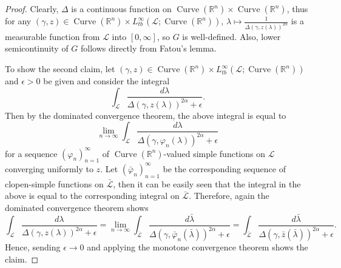 \documentclass[reqno,centertags,12pt]{amsart}
\theoremstyle{definition}
\numberwithin{equation}{section}
\newcommand{\seq}[1]{\left( #1 \right)}
\newcommand{\bbR}{{\mathbb{R}}}
\begin{document}
\begin{proof}
    Clearly, $\Delta$ is a continuous function on
    $\operatorname{Curve}(\bbR^{n})\times\operatorname{Curve}(\bbR^{n})$, thus
    for any $(\gamma,z)\in \operatorname{Curve}(\bbR^{n})
    \times L_{tb}^{\infty}(\mathcal{L};\operatorname{Curve}(\bbR^{n}))$,
    $\lambda\mapsto\frac{1}{\Delta(\gamma,z(\lambda))^{2\alpha}}$
    is a measurable function from $\mathcal{L}$ into $[0,\infty]$, so
    $G$ is well-defined. Also, lower semicontinuity of $G$
    follows directly from Fatou's lemma.

    To show the second claim, let $(\gamma,z)\in \operatorname{Curve}(\bbR^{n})
    \times L_{tb}^{\infty}(\mathcal{L};\operatorname{Curve}(\bbR^{n}))$
    and $\epsilon>0$ be given and consider the integral
    \[
        \int_{\mathcal{L}}\frac{d\lambda}
        {\Delta(\gamma,z(\lambda))^{2\alpha} + \epsilon}.
    \]
    Then by the dominated convergence theorem, the above integral is equal to
    \[
        \lim_{n\to\infty}\int_{\mathcal{L}}\frac{d\lambda}
        {\Delta(\gamma,\varphi_{n}(\lambda))^{2\alpha} + \epsilon}
    \]
    for a sequence $\seq{\varphi_{n}}_{n=1}^{\infty}$ of $\operatorname{Curve}(\bbR^{n})$-valued
    simple functions on $\mathcal{L}$ converging uniformly to $z$. Let
    $\seq{\bar{\varphi}_{n}}_{n=1}^{\infty}$ be the corresponding sequence of
    clopen-simple functions on $\bar{\mathcal{L}}$, then it can be easily seen that
    the integral in the above is equal to the corresponding integral on $\bar{\mathcal{L}}$.
    Therefore, again the dominated convergence theorem shows
    \[
        \int_{\mathcal{L}}\frac{d\lambda}
        {\Delta(\gamma,z(\lambda))^{2\alpha} + \epsilon}
        = \lim_{n\to\infty}\int_{\bar{\mathcal{L}}}\frac{d\bar{\lambda}}
        {\Delta(\gamma,\bar{\varphi}_{n}(\bar{\lambda}))^{2\alpha} + \epsilon}
        = \int_{\bar{\mathcal{L}}}\frac{d\bar{\lambda}}
        {\Delta(\gamma,\bar{z}(\bar{\lambda}))^{2\alpha} + \epsilon}.
    \]
    Hence, sending $\epsilon\to 0$ and applying the monotone convergence theorem
    shows the claim.
\end{proof}
\end{document}
